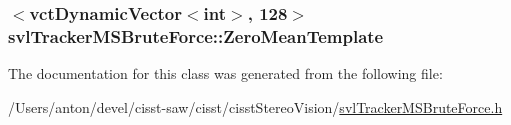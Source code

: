 \subsubsection[{Zero\+Mean\+Template}]{$<${\bf vct\+Dynamic\+Vector}$<$int$>$, 128$>$ svl\+Tracker\+M\+S\+Brute\+Force\+::\+Zero\+Mean\+Template\hspace{0.3cm}{\ttfamily [protected]}}\label{classsvl_tracker_m_s_brute_force_abc0f2604ffefdaeb0cca4d5653edf099}


The documentation for this class was generated from the following file\+:\begin{DoxyCompactItemize}
\item 
/\+Users/anton/devel/cisst-\/saw/cisst/cisst\+Stereo\+Vision/\hyperlink{svl_tracker_m_s_brute_force_8h}{svl\+Tracker\+M\+S\+Brute\+Force.\+h}\end{DoxyCompactItemize}
